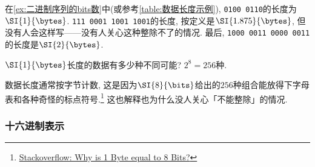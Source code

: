 \documentclass{ctexart}
\def\binaryseq#1{{\texttt{#1}}}
\begin{document}
\begin{sample}
    \begin{ex}
        在\cref{ex:二进制序列的bits数}中(或参考\cref{table:数据长度示例}), \binaryseq{0100 0110}的长度为$\SI{1}{\bytes}$. \binaryseq{111 0001 1001 1001}的长度, 按定义是$\SI{1.875}{\bytes}$, 但没有人会这样写——没有人关心这种整除不了的情况. 最后, \binaryseq{1000 0011 0000 0011}的长度是$\SI{2}{\bytes}$.
    \end{ex}
    \begin{ex}
        $\SI{1}{\bytes}$长度的数据有多少种不同可能? $2^8 = 256$种.
    \end{ex}
\end{sample}
\begin{remark}
    数据长度通常按字节计数, 这是因为$\SI{8}{\bits}$给出的$256$种组合能放得下字母表和各种奇怪的标点符号.\footnote{\href{https://stackoverflow.com/questions/42842662/why-is-1-byte-equal-to-8-bits}{Stackoverflow: Why is 1 Byte equal to 8 Bits?}} 这也解释也为什么没人关心「不能整除」的情况.
\end{remark}


\subsubsection{十六进制表示} %
\label{ssub:十六进制表示}
\end{document}
